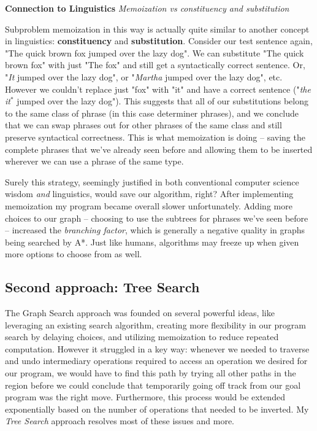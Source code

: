 \documentclass[runningheads]{llncs}
\begin{document}
\begin{tcolorbox}[colframe=black,colback=white,boxrule=0.5pt,arc=2pt]
\textbf{Connection to Linguistics} \textit{Memoization vs constituency and substitution}

Subproblem memoization in this way is actually quite similar to another concept in linguistics: \textbf{constituency} and \textbf{substitution}. Consider our test sentence again, "The quick brown fox jumped over the lazy dog". We can substitute "The quick brown fox" with just "The fox" and still get a syntactically correct sentence. Or, "\textit{It} jumped over the lazy dog", or "\textit{Martha} jumped over the lazy dog", etc. However we couldn't replace just "fox" with "it" and have a correct sentence ("\textit{the it}$^*$ jumped over the lazy dog"). This suggests that all of our substitutions belong to the same class of phrase (in this case determiner phrases), and we conclude that we can swap phrases out for other phrases of the same class and still preserve syntactical correctness. This is what memoization is doing -- saving the complete phrases that we've already seen before and allowing them to be inserted wherever we can use a  phrase of the same type.
\end{tcolorbox}
Surely this strategy, seemingly justified in both conventional computer science wisdom \textit{and} linguistics, would save our algorithm, right? After implementing memoization my program became overall slower unfortunately. Adding more choices to our graph -- choosing to use the subtrees for phrases we've seen before -- increased the \textit{branching factor}, which is generally a negative quality in graphs being searched by A*. Just like humans, algorithms may freeze up when given more options to choose from as well.

\subsection{Second approach: Tree Search}
The Graph Search approach was founded on several powerful ideas, like leveraging an existing search algorithm, creating more flexibility in our program search by delaying choices, and utilizing memoization to reduce repeated computation. However it struggled in a key way: whenever we needed to traverse and undo intermediary operations required to access an operation we desired for our program, we would have to find this path by trying all other paths in the region before we could conclude that temporarily going off track from our goal program was the right move. Furthermore, this process would be extended exponentially based on the number of operations that needed to be inverted. My \textit{Tree Search} approach resolves most of these issues and more.
\end{document}
